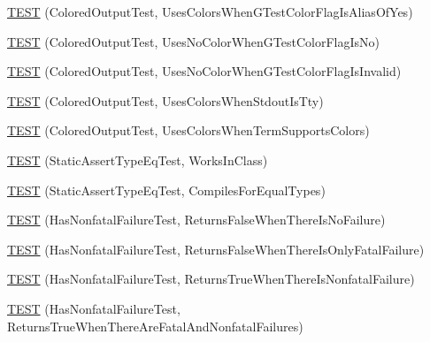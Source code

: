 \begin{DoxyCompactItemize}
\item 
\mbox{\hyperlink{googletest-master_2googletest_2test_2gtest__unittest_8cc_aa9a0db525d07d5e2afea545471d1f654}{T\+E\+ST}} (Colored\+Output\+Test, Uses\+Colors\+When\+G\+Test\+Color\+Flag\+Is\+Alias\+Of\+Yes)
\item 
\mbox{\hyperlink{googletest-master_2googletest_2test_2gtest__unittest_8cc_aac5bec0b24eebf52985abcd6234335fe}{T\+E\+ST}} (Colored\+Output\+Test, Uses\+No\+Color\+When\+G\+Test\+Color\+Flag\+Is\+No)
\item 
\mbox{\hyperlink{googletest-master_2googletest_2test_2gtest__unittest_8cc_a7f15883b04b4975f604be288955952fb}{T\+E\+ST}} (Colored\+Output\+Test, Uses\+No\+Color\+When\+G\+Test\+Color\+Flag\+Is\+Invalid)
\item 
\mbox{\hyperlink{googletest-master_2googletest_2test_2gtest__unittest_8cc_a2a995937bc9d0b16d65e5bcaa5fc781e}{T\+E\+ST}} (Colored\+Output\+Test, Uses\+Colors\+When\+Stdout\+Is\+Tty)
\item 
\mbox{\hyperlink{googletest-master_2googletest_2test_2gtest__unittest_8cc_a6dd6677e63340771dc55ad96a0697f11}{T\+E\+ST}} (Colored\+Output\+Test, Uses\+Colors\+When\+Term\+Supports\+Colors)
\item 
\mbox{\hyperlink{googletest-master_2googletest_2test_2gtest__unittest_8cc_a267c6521e900e2d6096653f1b0df7f32}{T\+E\+ST}} (Static\+Assert\+Type\+Eq\+Test, Works\+In\+Class)
\item 
\mbox{\hyperlink{googletest-master_2googletest_2test_2gtest__unittest_8cc_a896a075b2d244e3961f0fb3c13614f2b}{T\+E\+ST}} (Static\+Assert\+Type\+Eq\+Test, Compiles\+For\+Equal\+Types)
\item 
\mbox{\hyperlink{googletest-master_2googletest_2test_2gtest__unittest_8cc_a9f9166027da63504b2306b8f5e5a88b1}{T\+E\+ST}} (Has\+Nonfatal\+Failure\+Test, Returns\+False\+When\+There\+Is\+No\+Failure)
\item 
\mbox{\hyperlink{googletest-master_2googletest_2test_2gtest__unittest_8cc_ad25e0382fb27cfff590e2c104c504dff}{T\+E\+ST}} (Has\+Nonfatal\+Failure\+Test, Returns\+False\+When\+There\+Is\+Only\+Fatal\+Failure)
\item 
\mbox{\hyperlink{googletest-master_2googletest_2test_2gtest__unittest_8cc_a1d7caf8788fecd939c4a4e23c23e52ff}{T\+E\+ST}} (Has\+Nonfatal\+Failure\+Test, Returns\+True\+When\+There\+Is\+Nonfatal\+Failure)
\item 
\mbox{\hyperlink{googletest-master_2googletest_2test_2gtest__unittest_8cc_a7df9189826b8aab71331bb7fec0b57cb}{T\+E\+ST}} (Has\+Nonfatal\+Failure\+Test, Returns\+True\+When\+There\+Are\+Fatal\+And\+Nonfatal\+Failures)

\end{DoxyCompactItemize}
